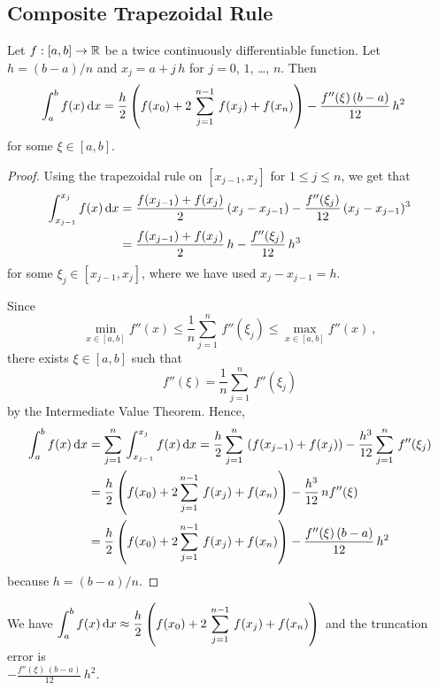 \subsection{Composite Trapezoidal Rule}

\begin{theorem}
Let $f:[a,b]\rightarrow \mathbb{R}$ be a twice continuously
differentiable function.  Let $h=(b-a)/n$ and
$x_j = a+j\,h$ for $j=0$, $1$, \ldots, $n$.  Then
\begin{align*}
\int_{a}^{b}f(x)\,\mathrm{d}x &= \frac{h}{2} \left(
f(x_0)+2\,\sum_{j=1}^{n-1}\,f(x_j)+f(x_n)\right) -
\frac{f''(\xi)\,(b-a)}{12}\,h^2
\end{align*}
for some $\xi \in [a,b]$.
\label{CTR}
\end{theorem}

\begin{proof}
Using the trapezoidal rule on $[x_{j-1},x_j]$ for $1 \leq j \leq n$,
we get that
\begin{align*}
\int_{x_{j-1}}^{x_j} f(x) \,\mathrm{d}x
&= \frac{f(x_{j-1}) + f(x_j)}{2} \left(x_j-x_{j-1}\right) -
\frac{f''(\xi_j)}{12}\,(x_j-x_{j-1})^3 \\
&= \frac{f(x_{j-1}) + f(x_j)}{2}\,h - \frac{f''(\xi_j)}{12}\,h^3
\end{align*}
for some $\xi_j \in [x_{j-1},x_j]$, where we have used $x_j-x_{j-1} = h$.

Since
\[
\min_{x\in [a,b]} f''(x) \leq
\frac{1}{n}\sum_{j=1}^{n}\,f''(\xi_j) \leq
\max_{x\in [a,b]} f''(x) \ ,
\]
there exists $\xi \in [a,b]$ such that
\[
f''(\xi) = \frac{1}{n}\sum_{j=1}^{n}\,f''(\xi_j)
\]
by the Intermediate Value Theorem.  Hence,
\begin{align*}
\int_a^b f(x) \,\mathrm{d}x
&= \sum_{j=1}^{n}\,\int_{x_{j-1}}^{x_j} f(x)\,\mathrm{d}x
= \frac{h}{2}\sum_{j=1}^{n}\,\left(f(x_{j-1}) + f(x_j)\right) -
\frac{h^3}{12}\sum_{j=1}^{n}\,f''(\xi_j) \\
&= \frac{h}{2} \left(f(x_0) + 2\sum_{j=1}^{n-1}\,f(x_j) +
  f(x_n)\right) - \frac{h^3}{12}\,n f''(\xi) \\
&= \frac{h}{2} \left(f(x_0) + 2\sum_{j=1}^{n-1}\,f(x_j) +
  f(x_n)\right) - \frac{f''(\xi)\,(b-a)}{12}\,h^2
\end{align*}
because $h = (b-a)/n$.
\end{proof}


\begin{rmk}
We have $\displaystyle \int_a^b f(x)\,\mathrm{d}x \approx
\frac{h}{2} \left( f(x_0)+2\,\sum_{j=1}^{n-1}\,f(x_j)+f(x_n)\right)$
and the truncation error is\\
$\displaystyle -\frac{f''(\xi)\,(b-a)}{12}\,h^2$.
\end{rmk}

